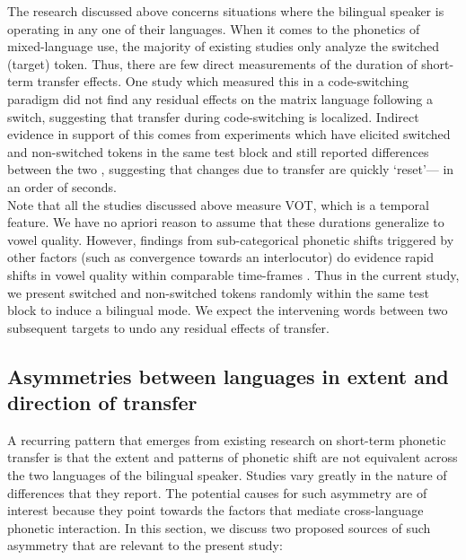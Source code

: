 \documentclass[12 pt]{article}
\begin{document}
The research discussed above concerns situations where the bilingual speaker is operating in any one of their languages. When it comes to the phonetics of mixed-language use, the majority of existing studies only analyze the switched (target) token. Thus, there are few direct measurements of the duration of short-term transfer effects. One study which measured this in a code-switching paradigm \citep{bullock2009trying} did not find any residual effects on the matrix language following a switch, suggesting that transfer during code-switching is localized. Indirect evidence in support of this comes from experiments which have elicited switched and non-switched tokens in the same test block and still reported differences between the two \citep[e.g.][]{tsui2019impact,olson2013bilingual}, suggesting that changes due to transfer are quickly `reset'--- in an order of seconds.\\
Note that all the studies discussed above measure VOT, which is a temporal feature. We have no apriori reason to assume that these durations generalize to vowel quality. However, findings from sub-categorical phonetic shifts triggered by other factors (such as convergence towards an interlocutor) do evidence rapid shifts in vowel quality within comparable time-frames \citep[e.g.][]{pardo2010expressing,babel2010dialect,babel2012evidence}. Thus in the current study, we present switched and non-switched tokens randomly within the same test block to induce a bilingual mode. We expect the intervening words between two subsequent targets to undo any residual effects of transfer.


\subsection{Asymmetries between languages in extent and direction of transfer} \label{asymmetries}
A recurring pattern that emerges from existing research on short-term phonetic transfer is that the extent and patterns of phonetic shift are not equivalent across the two languages of the bilingual speaker. Studies vary greatly in the nature of differences that they report. The potential causes for such asymmetry are of interest because they point towards the factors that mediate cross-language phonetic interaction. In this section, we discuss two proposed sources of such asymmetry that are relevant to the present study: 
\end{document}
